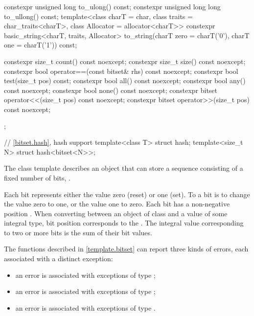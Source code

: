 \begin{codeblock}
{{    constexpr unsigned long to_ulong() const;
    constexpr unsigned long long to_ullong() const;
    template<class charT = char,
             class traits = char_traits<charT>,
             class Allocator = allocator<charT>>
      constexpr basic_string<charT, traits, Allocator>
        to_string(charT zero = charT('0'), charT one = charT('1')) const;

    constexpr size_t count() const noexcept;
    constexpr size_t size() const noexcept;
    constexpr bool operator==(const bitset& rhs) const noexcept;
    constexpr bool test(size_t pos) const;
    constexpr bool all() const noexcept;
    constexpr bool any() const noexcept;
    constexpr bool none() const noexcept;
    constexpr bitset operator<<(size_t pos) const noexcept;
    constexpr bitset operator>>(size_t pos) const noexcept;
  };

  // \ref{bitset.hash}, hash support
  template<class T> struct hash;
  template<size_t N> struct hash<bitset<N>>;
}
\end{codeblock}

\pnum
The class template
describes an object that can store a sequence consisting of a fixed number of
bits, .

\pnum
Each bit represents either the value zero (reset) or one (set).
To
a bit is to change the value zero to one, or the value one to
zero.
Each bit has a non-negative position .
When converting
between an object of class
and a value of some
integral type, bit position  corresponds to the
.
The integral value corresponding to two
or more bits is the sum of their bit values.

\pnum
The functions described in \ref{template.bitset} can report three kinds of
errors, each associated with a distinct exception:
\begin{itemize}
\item
an
error is associated with exceptions of type
;
%
\item
an
error is associated with exceptions of type
;
%
\item
an
error is associated with exceptions of type
.
%
\end{itemize}

